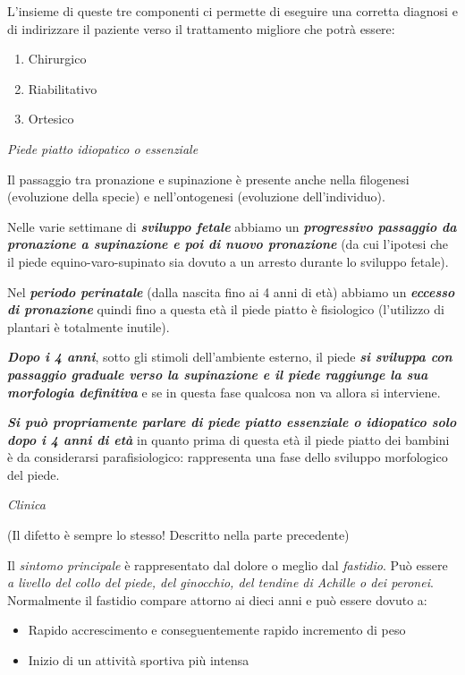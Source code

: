 \documentclass[]{article}
\begin{document}
L'insieme di queste tre componenti ci permette di eseguire una corretta
diagnosi e di indirizzare il paziente verso il trattamento migliore che
potrà essere:

\begin{enumerate}
\def\labelenumi{\arabic{enumi}.}
\item
  Chirurgico
\item
  Riabilitativo
\item
  Ortesico
\end{enumerate}

\emph{Piede piatto idiopatico o essenziale}

Il passaggio tra pronazione e supinazione è presente anche nella
filogenesi (evoluzione della specie) e nell'ontogenesi (evoluzione
dell'individuo).

Nelle varie settimane di \textbf{\emph{sviluppo fetale}} abbiamo un
\textbf{\emph{progressivo passaggio da pronazione a supinazione e poi di
nuovo pronazione}} (da cui l'ipotesi che il piede equino-varo-supinato
sia dovuto a un arresto durante lo sviluppo fetale).

Nel \textbf{\emph{periodo perinatale}} (dalla nascita fino ai 4 anni di
età) abbiamo un \textbf{\emph{eccesso di pronazione}} quindi fino a
questa età il piede piatto è fisiologico (l'utilizzo di plantari è
totalmente inutile).

\textbf{\emph{Dopo i 4 anni}}, sotto gli stimoli dell'ambiente esterno,
il piede \textbf{\emph{si sviluppa con passaggio graduale verso la
supinazione e il piede raggiunge la sua morfologia definitiva}} e se in
questa fase qualcosa non va allora si interviene.

\textbf{\emph{Si può propriamente parlare di piede piatto essenziale o
idiopatico solo dopo i 4 anni di età}} in quanto prima di questa età il
piede piatto dei bambini è da considerarsi parafisiologico: rappresenta
una fase dello sviluppo morfologico del piede.

\emph{\emph{Clinica}}

(Il difetto è sempre lo stesso! Descritto nella parte precedente)

Il \emph{sintomo principale} è rappresentato dal dolore o meglio dal
\emph{fastidio}. Può essere \emph{a livello del collo del piede, del
ginocchio, del tendine di Achille o dei peronei}. Normalmente il
fastidio compare attorno ai dieci anni e può essere dovuto a:

\begin{itemize}
\item
  Rapido accrescimento e conseguentemente rapido incremento di peso
\item
  Inizio di un attività sportiva più intensa
\end{itemize}
\end{document}
